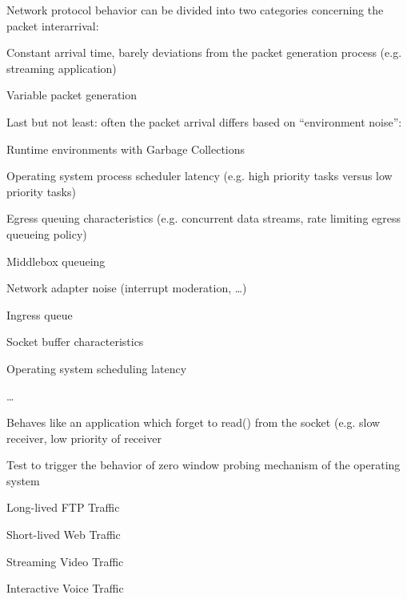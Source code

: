 \documentclass[9pt]{article}
\begin{document}
\begin{slide}
\bi
	\item 
\ei
\end{slide}


\begin{slide}
\bi
	\item Network protocol behavior can be divided into two categories concerning the packet interarrival:
	\bi
		\item Constant arrival time, barely deviations from the packet generation process (e.g. streaming application)
		\item Variable packet generation
	\ei
	\item Last but not least: often the packet arrival differs based on ``environment noise'':
	\bi
		\item Runtime environments with Garbage Collections
		\item Operating system process scheduler latency (e.g. high priority tasks versus low priority tasks)
		\item Egress queuing characteristics (e.g. concurrent data streams, rate limiting egress queueing policy)
		\item Middlebox queueing
		\item Network adapter noise (interrupt moderation, \dots)
		\item Ingress queue
		\item Socket buffer characteristics
		\item Operating system scheduling latency
		\item \dots
	\ei
\ei
\end{slide}


\begin{slide}
\bi
	\item Behaves like an application which forget to read() from the socket (e.g. slow receiver, low priority of receiver
	\item Test to trigger the behavior of zero window probing mechanism of the operating system
\ei
\end{slide}


\begin{slide}
\bi
	\item Long-lived FTP Traffic
	\item Short-lived Web Traffic
	\item Streaming Video Traffic
	\item Interactive Voice Traffic
\ei
\end{slide}
\end{document}

